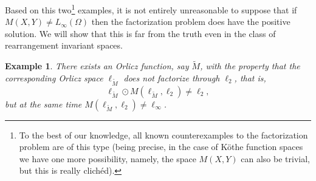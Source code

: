 \documentclass[11pt]{amsart}
\theoremstyle{definition}
\theoremstyle{definition}
\theoremstyle{definition}
\theoremstyle{definition}
\theoremstyle{definition}
\theoremstyle{definition}
\theoremstyle{definition}
\newtheorem{example}[theorem]{Example}
\theoremstyle{definition}
\numberwithin{equation}{section}
\numberwithin{equation}{section}
\numberwithin{equation}{section}
\theoremstyle{definition}
\theoremstyle{definition}
\theoremstyle{definition}
\theoremstyle{definition}
\theoremstyle{definition}
\theoremstyle{definition}
\begin{document}
Based on this two\footnote{To the best of our knowledge, all known counterexamples to the factorization problem are of this type (being precise,
in the case of K{\" o}the function spaces we have one more possibility, namely, the space $M(X,Y)$ can also be trivial, but this is really clich{\' e}d).}
examples, it is not entirely unreasonable to suppose that if $M(X,Y) \neq L_{\infty}(\Omega)$ then the factorization problem does have the positive solution.
We will show that this is far from the truth even in the class of rearrangement invariant spaces.

\begin{example} \label{PROPOSITION: Appendix A - counterexample factorization}
	{\it There exists an Orlicz function, say $\widetilde{M}$, with the property that the corresponding Orlicz space $\ell_{\widetilde{M}}$
		does not factorize through $\ell_2$, that is,}
		\begin{equation*}
			\ell_{\widetilde{M}} \odot M(\ell_{\widetilde{M}}, \ell_2) \neq \ell_2,
		\end{equation*}		
	{\it but at the same time $M(\ell_{\widetilde{M}}, \ell_2) \neq \ell_{\infty}$.}
\end{example}
\end{document}
